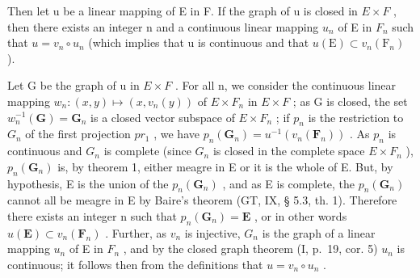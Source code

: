 Then let u be a linear mapping of E in F. If the graph of u is closed in \(E \times F\) , then there exists an integer n and a continuous linear mapping \(u_{n}\) of E in \(F_{n}\) such that \(u = v_{n} \circ u_{n}\) (which implies that u is continuous and that \(u(\mathrm{E}) \subset v_{n}(\mathrm{F}_{n})\) ).

Let G be the graph of u in \(E \times F\) . For all n, we consider the continuous linear mapping \(w_{n}:(x,y)\mapsto(x,v_{n}(y))\) of \(E \times F_{n}\) in \(E \times F\) ; as G is closed, the set \(w_{n}^{-1}(\mathbf{G})=\mathbf{G}_{n}\) is a closed vector subspace of \(E \times F_{n}\) ; if \(p_{n}\) is the restriction to \(G_{n}\) of the first projection \(pr_{1}\) , we have \(p_{n}(\mathbf{G}_{n})=u^{-1}(v_{n}(\mathbf{F}_{n}))\) . As \(p_{n}\) is continuous and \(G_{n}\) is complete (since \(G_{n}\) is closed in the complete space \(E \times F_{n}\) ), \(p_{n}(\mathbf{G}_{n})\) is, by theorem 1, either meagre in E or it is the whole of E. But, by hypothesis, E is the union of the \(p_{n}(\mathbf{G}_{n})\) , and as E is complete, the \(p_{n}(\mathbf{G}_{n})\) cannot all be meagre in E by Baire's theorem (GT, IX, § 5.3, th. 1). Therefore there exists an integer n such that \(p_{n}(\mathbf{G}_{n}) = \mathbf{E}\) , or in other words \(u(\mathbf{E}) \subset v_{n}(\mathbf{F}_{n})\) . Further, as \(v_{n}\) is injective, \(G_{n}\) is the graph of a linear mapping \(u_{n}\) of E in \(F_{n}\) , and by the closed graph theorem (I, p.~19, cor. 5) \(u_{n}\) is continuous; it follows then from the definitions that \(u = v_{n} \circ u_{n}\) .


